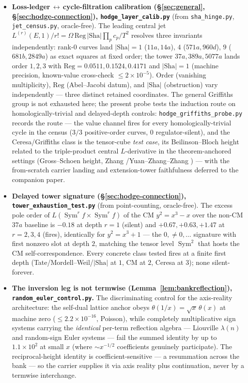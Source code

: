 \documentclass[11pt]{article}
\theoremstyle{definition}
\newcommand{\Sym}{\operatorname{Sym}}
\newcommand{\Sha}{\mathrm{Sha}}
\begin{document}
\begin{itemize}
\item \textbf{Loss-ledger\,$\leftrightarrow$\,cycle-filtration calibration (\S\ref{sec:general},
\S\ref{sec:hodge-connection}), \texttt{hodge\_layer\_calib.py}} (from \texttt{sha\_hinge.py}, \texttt{jet\_census.py},
oracle-free). The leading central jet $L^{(r)}(E,1)/r!=\Omega\,\mathrm{Reg}\,|\Sha|\prod_p c_p/T^2$ resolves
three invariants independently: rank-$0$ curves land $|\Sha|=1$ ($11a,14a$), $4$ ($571a,960d$), $9$
($681b,2849a$) as exact squares at fixed order; the tower $37a,389a,5077a$ lands order $1,2,3$ with
$\mathrm{Reg}=0.0511,0.1524,0.4171$ and $|\Sha|=1$ (machine precision, known-value cross-check $\le
2\times10^{-5}$). Order (vanishing multiplicity), $\mathrm{Reg}$ (Abel--Jacobi datum), and $|\Sha|$
(obstruction) vary independently --- three distinct retained coordinates. The general Griffiths group is
not exhausted here; the present probe tests the induction route on homologically-trivial and delayed-depth
controls: \texttt{hodge\_griffiths\_probe.py} records the route
--- the value channel fires for every homologically-trivial cycle in the census ($3/3$ positive-order
curves, $0$ regulator-silent), and the Ceresa/Griffiths class is the tensor-cube \emph{test case}, its
Beilinson--Bloch height related to the triple-product central $L$-derivative in the theorem-anchored
settings (Gross--Schoen height, Zhang \cite{ZhangGS}/Yuan--Zhang--Zhang \cite{YZZ}) --- with the
from-scratch carrier landing and extension-tower faithfulness deferred to the companion paper.

\item \textbf{Delayed tower signature (\S\ref{sec:hodge-connection}), \texttt{tower\_exhaustion\_test.py}}
(from point-counting, oracle-free). The excess pole order of $L(\Sym^r f\times\Sym^r f)$ of the CM
$y^2=x^3-x$ over the non-CM $37a$ baseline is $-0.18$ at depth $r=1$ (silent) and $+0.67,+0.63,+1.47$ at
$r=2,3,4$ (fires), identically for $y^2=x^3+1$ --- the $0,\neq0,\dots$ signature with first nonzero slot
at depth $2$, matching the tensor level $\Sym^2$ that hosts the CM self-correspondence. Every concrete
class tested fires at a finite first depth (Tate/Mordell--Weil/$|\Sha|$ at $1$, CM at $2$, Ceresa at $3$);
none silent-forever.

\item \textbf{The inversion leg is not termwise (Lemma~\ref{lem:bankreflection}),
\texttt{random\_euler\_control.py}.} The discriminating control for the axis-reality architecture: the
self-dual lattice anchor obeys $\theta(1/x)=\sqrt x\,\theta(x)$ at machine zero ($\le2.2\times10^{-16}$,
Poisson), while completely multiplicative sign systems carrying the \emph{identical} per-term reflection
algebra --- Liouville $\lambda(n)$ and random-sign Euler systems --- fail the summed identity by up to
$1.1\times10^{2}$ at small $x$ (where $\sim x^{-1/2}$ coefficients genuinely participate). The
reciprocal-height identity is coefficient-sensitive --- a resummation across the bank --- so the carrier
supplies it via axis reality plus continuation, never by a termwise interchange.


\end{itemize}
\end{document}
